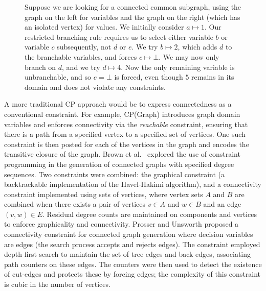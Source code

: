 \documentclass{llncs}
\begin{document}
\begin{figure}[tb]

    \caption{Suppose we are looking for a connected common subgraph, using the graph on the left
        for variables and the graph on the right (which has an isolated vertex) for values. We
        initially consider $a \mapsto 1$. Our restricted branching rule requires us to select either variable
        $b$ or variable $c$ subsequently, not $d$ or $e$. We try $b \mapsto 2$, which adds $d$
        to the branchable variables, and forces $c \mapsto \bot$. We may now only branch on $d$, and
        we try $d \mapsto 4$. Now the only remaining variable is unbranchable, and so $e = \bot$ is forced, even
        though $5$ remains in its domain and does not violate any constraints.}\label{figure:restricted}
\end{figure}

A more traditional CP approach would be to express connectedness as a conventional constraint. For
example, CP(Graph) \cite{DBLP:conf/cp/DoomsDD05} introduces graph domain variables and enforces
connectivity via the \emph{reachable} constraint, ensuring that there is a path from a specified
vertex to a specified set of vertices. One such constraint is then posted for each of the vertices
in the graph and encodes the transitive closure of the graph. Brown et al.\ \cite{Brown:2005}
explored the use of constraint programming in the generation of connected graphs with specified
degree sequences.  Two constraints were combined: the graphical constraint (a backtrackable
implementation of the Havel-Hakimi algorithm), and a connectivity constraint implemented using sets
of vertices, where vertex sets $A$ and $B$ are combined when there exists a pair of vertices $v \in
A$ and $w \in B$ and an edge $(v,w) \in E$. Residual degree counts are maintained on components and
vertices to enforce graphicality and connectivity. Prosser and Unsworth
\cite{DBLP:conf/ecai/ProsserU06} proposed a connectivity constraint for connected graph generation
where decision variables are edges (the search process accepts and rejects edges). The constraint
employed depth first search to maintain the set of tree edges and back edges, associating path
counters on these edges. The counters were then used to detect the existence of cut-edges and
protects these by forcing edges; the complexity of this constraint is cubic in the number of
vertices.
\end{document}
